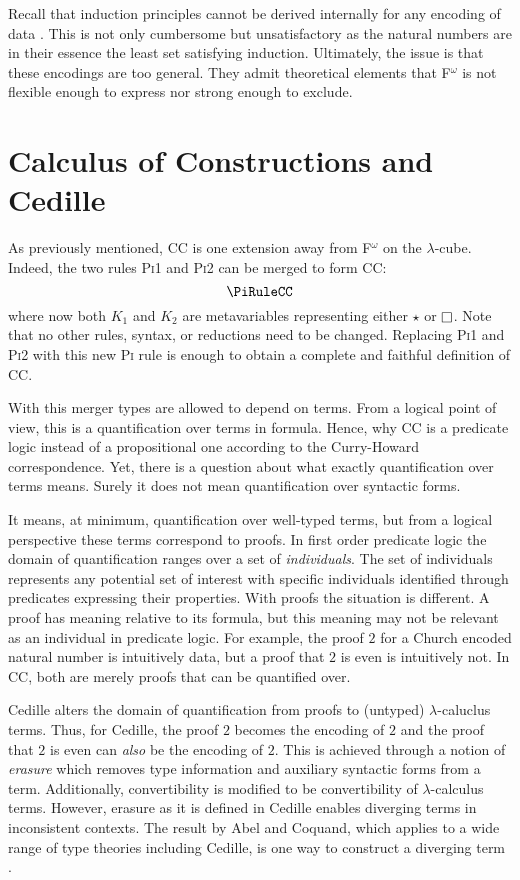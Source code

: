 Recall that induction principles cannot be derived internally for any encoding of data \cite{geuvers2001_noind}.
This is not only cumbersome but unsatisfactory as the natural numbers are in their essence the least set satisfying induction.
Ultimately, the issue is that these encodings are too general.
They admit theoretical elements that F$^\omega$ is not flexible enough to express nor strong enough to exclude.

\section{Calculus of Constructions and Cedille}

As previously mentioned, CC is one extension away from F$^\omega$ on the $\lambda$-cube.
Indeed, the two rules \textsc{Pi1} and \textsc{Pi2} can be merged to form CC:
$$\PiRuleCC$$
where now both $K_1$ and $K_2$ are metavariables representing either $\star$ or $\kind$.
Note that no other rules, syntax, or reductions need to be changed.
Replacing \textsc{Pi1} and \textsc{Pi2} with this new \textsc{Pi} rule is enough to obtain a complete and faithful definition of CC.

With this merger types are allowed to depend on terms.
From a logical point of view, this is a quantification over terms in formula.
Hence, why CC is a predicate logic instead of a propositional one according to the Curry-Howard correspondence.
Yet, there is a question about what exactly quantification over terms means.
Surely it does not mean quantification over syntactic forms.

It means, at minimum, quantification over well-typed terms, but from a logical perspective these terms correspond to proofs.
In first order predicate logic the domain of quantification ranges over a set of \textit{individuals}.
The set of individuals represents any potential set of interest with specific individuals identified through predicates expressing their properties.
With proofs the situation is different.
A proof has meaning relative to its formula, but this meaning may not be relevant as an individual in predicate logic.
For example, the proof $2$ for a Church encoded natural number is intuitively data, but a proof that $2$ is even is intuitively not.
In CC, both are merely proofs that can be quantified over.

Cedille alters the domain of quantification from proofs to (untyped) $\lambda$-caluclus terms.
Thus, for Cedille, the proof $2$ becomes the encoding of $2$ and the proof that $2$ is even can \textit{also} be the encoding of $2$.
This is achieved through a notion of \textit{erasure} which removes type information and auxiliary syntactic forms from a term.
Additionally, convertibility is modified to be convertibility of $\lambda$-calculus terms.
However, erasure as it is defined in Cedille enables diverging terms in inconsistent contexts.
The result by Abel and Coquand, which applies to a wide range of type theories including Cedille, is one way to construct a diverging term \cite{abel2020_normalization}.


